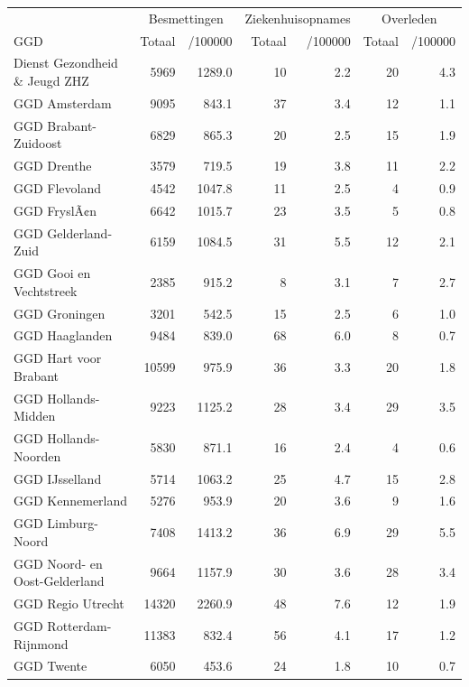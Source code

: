 \documentclass[
  english,
  man,floatsintext]{apa6}
\begin{document}
\begin{table}
\centering\begingroup\fontsize{10}{12}\selectfont

\begin{threeparttable}
\begin{tabular}{lrrrrrr}
\toprule
\multicolumn{1}{c}{ } & \multicolumn{2}{c}{Besmettingen} & \multicolumn{2}{c}{Ziekenhuisopnames} & \multicolumn{2}{c}{Overleden} \\
\cmidrule(l{3pt}r{3pt}){2-3} \cmidrule(l{3pt}r{3pt}){4-5} \cmidrule(l{3pt}r{3pt}){6-7}
GGD & Totaal & /100000 & Totaal & /100000 & Totaal & /100000\\
\midrule
Dienst Gezondheid \& Jeugd ZHZ & 5969 & 1289.0 & 10 & 2.2 & 20 & 4.3\\
GGD Amsterdam & 9095 & 843.1 & 37 & 3.4 & 12 & 1.1\\
GGD Brabant-Zuidoost & 6829 & 865.3 & 20 & 2.5 & 15 & 1.9\\
GGD Drenthe & 3579 & 719.5 & 19 & 3.8 & 11 & 2.2\\
GGD Flevoland & 4542 & 1047.8 & 11 & 2.5 & 4 & 0.9\\
GGD FryslÃ¢n & 6642 & 1015.7 & 23 & 3.5 & 5 & 0.8\\
GGD Gelderland-Zuid & 6159 & 1084.5 & 31 & 5.5 & 12 & 2.1\\
GGD Gooi en Vechtstreek & 2385 & 915.2 & 8 & 3.1 & 7 & 2.7\\
GGD Groningen & 3201 & 542.5 & 15 & 2.5 & 6 & 1.0\\
GGD Haaglanden & 9484 & 839.0 & 68 & 6.0 & 8 & 0.7\\
GGD Hart voor Brabant & 10599 & 975.9 & 36 & 3.3 & 20 & 1.8\\
GGD Hollands-Midden & 9223 & 1125.2 & 28 & 3.4 & 29 & 3.5\\
GGD Hollands-Noorden & 5830 & 871.1 & 16 & 2.4 & 4 & 0.6\\
GGD IJsselland & 5714 & 1063.2 & 25 & 4.7 & 15 & 2.8\\
GGD Kennemerland & 5276 & 953.9 & 20 & 3.6 & 9 & 1.6\\
GGD Limburg-Noord & 7408 & 1413.2 & 36 & 6.9 & 29 & 5.5\\
GGD Noord- en Oost-Gelderland & 9664 & 1157.9 & 30 & 3.6 & 28 & 3.4\\
GGD Regio Utrecht & 14320 & 2260.9 & 48 & 7.6 & 12 & 1.9\\
GGD Rotterdam-Rijnmond & 11383 & 832.4 & 56 & 4.1 & 17 & 1.2\\
GGD Twente & 6050 & 453.6 & 24 & 1.8 & 10 & 0.7\\

\end{tabular}
\end{threeparttable}
\end{table}
\end{document}
